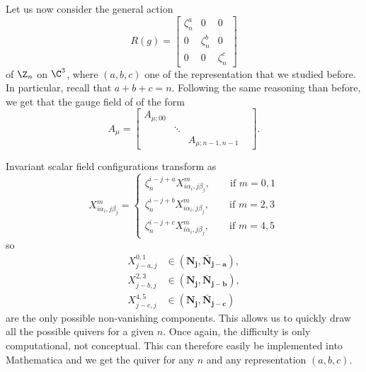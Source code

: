 \documentclass{worksheetclass}
\begin{document}
           Let us now consider the general action
           \begin{equation}
                R(g)=
                \begin{bmatrix}
                    \zeta^a_n & 0 & 0\\
                    0 & \zeta^b_n & 0\\
                    0 & 0 & \zeta^c_n
                \end{bmatrix}
           \end{equation}
           of $\Z_n$ on $\C^3$, where $(a,b,c)$ one of the representation that we studied before. In particular, recall that $a+b+c=n$. Following the same reasoning than before, we get that the gauge field of of the form
           \begin{equation}
               A_\mu=
               \begin{bmatrix}
                   A_{\mu;00} & & \\
                   & \ddots & & \\
                   & & A_{\mu;n-1,n-1}
               \end{bmatrix}.
           \end{equation}

           Invariant scalar field configurations transform as
           \begin{equation}
               X^m_{i\alpha_i,j\beta_j}=
               \begin{cases}
                   \zeta^{i-j+a}_nX^m_{i\alpha_i,j\beta_j},\qquad \text{if }m=0,1\\
                   \zeta^{i-j+b}_nX^m_{i\alpha_i,j\beta_j},\qquad \text{if }m=2,3\\
                   \zeta^{i-j+c}_nX^m_{i\alpha_i,j\beta_j},\qquad \text{if }m=4,5
               \end{cases}
           \end{equation}
           so
           \begin{align}
               X^{0,1}_{j-a,j} &\in (\boldsymbol{\textbf{N}_j},\boldsymbol{\bar{\textbf{N}}_{j-a}}),\\
               X^{2,3}_{j-b,j} &\in (\boldsymbol{\textbf{N}_j},\boldsymbol{\bar{\textbf{N}}_{j-b}}),\\
               X^{4,5}_{j-c,j} &\in (\boldsymbol{\textbf{N}_j},\boldsymbol{\bar{\textbf{N}}_{j-c}})
           \end{align}
           are the only possible non-vanishing components. This allows us to quickly draw all the possible quivers for a given $n$. Once again, the difficulty is only computational, not conceptual. This can therefore easily be implemented into Mathematica and we get the quiver for any $n$ and any representation $(a,b,c)$.
        
\end{document}
